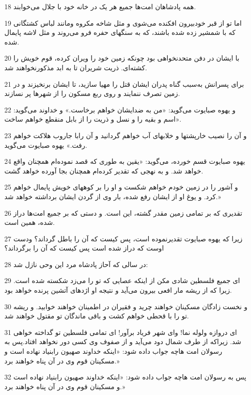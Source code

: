 \par 18 همه پادشاهان امت‌ها جمیع هر یک در خانه خود با جلال می‌خوابند.
\par 19 اما تو از قبر خودبیرون افکنده می‌شوی و مثل شاخه مکروه ومانند لباس کشتگانی که با شمشیر زده شده باشند، که به سنگهای حفره فرو می‌روند و مثل لاشه پایمال شده.
\par 20 با ایشان در دفن متحدنخواهی بود چونکه زمین خود را ویران کرده، قوم خویش را کشته‌ای. ذریت شریران تا به ابد مذکورنخواهند شد.
\par 21 برای پسرانش به‌سبب گناه پدران ایشان قتل را مهیا سازید، تا ایشان برنخیزند و در زمین تصرف ننمایند و روی ربع مسکون را از شهرها پر نسازند.
\par 22 و یهوه صبایوت می‌گوید: «من به ضدایشان خواهم برخاست.» و خداوند می‌گوید: «اسم و بقیه را و نسل و ذریت را از بابل منقطع خواهم ساخت.
\par 23 و آن را نصیب خارپشتها و خلابهای آب خواهم گردانید و آن رابا جاروب هلاکت خواهم رفت.» یهوه صبایوت می‌گوید.
\par 24 یهوه صبایوت قسم خورده، می‌گوید: «یقین به طوری که قصد نموده‌ام همچنان واقع خواهد شد. و به نهجی که تقدیر کرده‌ام همچنان بجا آورده خواهد گشت.
\par 25 و آشور را در زمین خودم خواهم شکست و او را بر کوههای خویش پایمال خواهم کرد. و یوغ او از ایشان رفع شده، بار وی از گردن ایشان برداشته خواهد شد.»
\par 26 تقدیری که بر تمامی زمین مقدر گشته، این است. و دستی که بر جمیع امت‌ها دراز شده، همین است.
\par 27 زیرا که یهوه صبایوت تقدیرنموده است، پس کیست که آن را باطل گرداند؟ ودست اوست که دراز شده است پس کیست که آن را برگرداند؟
\par 28 در سالی که آحاز پادشاه مرد این وحی نازل شد:
\par 29 ‌ای جمیع فلسطین شادی مکن از اینکه عصایی که تو را می‌زد شکسته شده است. زیرا که از ریشه مار افعی بیرون می‌آید و نتیجه او اژدهای آتشین پرنده خواهد بود.
\par 30 و نخست زادگان مسکینان خواهند چرید و فقیران در اطمینان خواهند خوابید. و ریشه تو را با قحطی خواهم کشت و باقی ماندگان تو مقتول خواهند شد.
\par 31 ‌ای دروازه ولوله نما! و‌ای شهر فریاد برآور! ای تمامی فلسطین تو گداخته خواهی شد. زیراکه از طرف شمال دود می‌آید و از صفوف وی کسی دور نخواهد افتاد.پس به رسولان امت هاچه جواب داده شود: «اینکه خداوند صهیون رابنیاد نهاده است و مسکینان قوم وی در آن پناه خواهند برد.»
\par 32 پس به رسولان امت هاچه جواب داده شود: «اینکه خداوند صهیون رابنیاد نهاده است و مسکینان قوم وی در آن پناه خواهند برد.»
 
